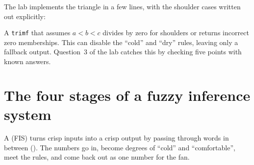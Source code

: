 The lab implements the triangle in a few lines, with the shoulder cases written out explicitly:



\begin{pitfall}
A \texttt{trimf} that assumes $a<b<c$ divides by zero for shoulders or returns incorrect zero memberships. This can disable the ``cold'' and ``dry'' rules, leaving only a fallback output. Question~3 of the lab catches this by checking five points with known answers.
\end{pitfall}

\section{The four stages of a fuzzy inference system}

A  (FIS) turns crisp inputs into a crisp output by passing through words in between (). The numbers go in, become degrees of ``cold'' and ``comfortable'', meet the rules, and come back out as one number for the fan.

